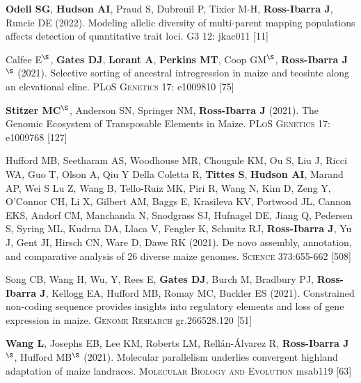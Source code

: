 \documentclass[letterpaper,10pt]{article}
\begin{document}
\begin{etaremune}
\item \textbf{Odell SG}, \textbf{Hudson AI}, Praud S, Dubreuil P, Tixier M-H, \textbf{Ross-Ibarra J}, Runcie DE (2022). Modeling allelic diversity of multi-parent mapping populations affects detection of quantitative trait loci. \textsc{G3} 12: jkac011 %
 [11]\\
\vspace{0.5cm}

\item Calfee E$^\S$, \textbf{Gates DJ}, \textbf{Lorant A}, \textbf{Perkins MT}, Coop GM$^\S$, \textbf{Ross-Ibarra J}$^\S$ (2021). Selective sorting of ancestral introgression in maize and teosinte along an elevational cline. \textsc{PLoS Genetics} 17: e1009810
 [75]\\

\item \textbf{Stitzer MC}$^\S$, Anderson SN, Springer NM, \textbf{Ross-Ibarra J} (2021). The Genomic Ecosystem of Transposable Elements in Maize. \textsc{PLoS Genetics} 17: e1009768
 [127]\\

\item Hufford MB, Seetharam AS, Woodhouse MR, Chougule KM, Ou S, Liu J, Ricci WA, Guo T, Olson A, Qiu Y Della Coletta R, \textbf{Tittes S}, \textbf{Hudson AI},  Marand AP, Wei S Lu Z, Wang B, Tello-Ruiz MK, Piri R, Wang N, Kim D, Zeng Y, O'Connor CH, Li X, Gilbert AM, Baggs E, Krasileva KV, Portwood JL, Cannon EKS, Andorf CM, Manchanda N, Snodgrass SJ, Hufnagel DE, Jiang Q, Pedersen S, Syring ML, Kudrna DA, Llaca V, Fengler K, Schmitz RJ, \textbf{Ross-Ibarra J}, Yu J, Gent JI, Hirsch CN, Ware D, Dawe RK (2021). De novo assembly, annotation, and comparative analysis of 26 diverse maize genomes. \textsc{Science} 373:655-662
 [508]\\

\item Song CB, Wang H, Wu, Y, Rees E, \textbf{Gates DJ}, Burch M,  Bradbury PJ, \textbf{Ross-Ibarra J}, Kellogg EA, Hufford MB, Romay MC, Buckler ES (2021).  Constrained non-coding sequence provides insights into regulatory elements and loss of gene expression in maize. \textsc{Genome Research} gr.266528.120 %
 [51]\\

\item \textbf{Wang L}, Josephs EB, Lee KM, Roberts LM, Rell\'{a}n-\'{A}lvarez R, \textbf{Ross-Ibarra J}$^\S$, Hufford MB$^\S$ (2021). Molecular parallelism underlies convergent highland adaptation of maize landraces. \textsc{Molecular Biology and Evolution} msab119 %
 [63]\\


\end{etaremune}
\end{document}
